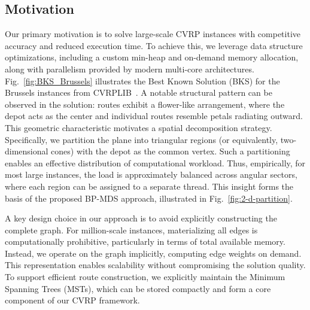 
\subsection{Motivation}
\label{sec:motivation}
Our primary motivation is to solve large-scale CVRP instances with competitive accuracy and reduced execution time. To achieve this, we leverage data structure optimizations, including a custom min-heap and on-demand memory allocation, along with parallelism provided by modern multi-core architectures. Fig.~\ref{fig:BKS_Brussels} illustrates the Best Known Solution (BKS) for the Brussels instances from CVRPLIB~\cite{CVRPLIB}. A notable structural pattern can be observed in the solution: routes exhibit a flower-like arrangement, where the depot acts as the center and individual routes resemble petals radiating outward. This geometric characteristic motivates a spatial decomposition strategy. Specifically, we partition the plane into triangular regions (or equivalently, two-dimensional cones) with the depot as the common vertex. Such a partitioning enables an effective distribution of computational workload. Thus, empirically, for most large instances, the load is approximately balanced across angular sectors, where each region can be assigned to a separate thread. This insight forms the basis of the proposed BP-MDS approach, illustrated in Fig.~\ref{fig:2-d-partition}. 

A key design choice in our approach is to avoid explicitly constructing the complete graph. For million-scale instances, materializing all edges is computationally prohibitive, particularly in terms of total available memory. Instead, we operate on the graph implicitly, computing edge weights on demand. This representation enables scalability without compromising the solution quality. To support efficient route construction, we explicitly maintain the Minimum Spanning Trees (MSTs), which can be stored compactly and form a core component of our CVRP framework.







